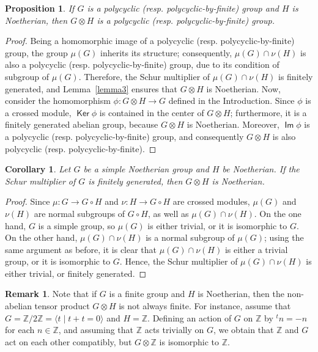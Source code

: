 \documentclass[12pt,reqno]{amsart}
\newtheorem{proposition}[subsection]{Proposition}
\newtheorem{corollary}[subsection]{Corollary}
\theoremstyle{definition}
\newtheorem{remark}[subsection]{Remark}
\numberwithin{equation}{section}
\theoremstyle{definition}
\DeclareMathOperator{\Ker}{\mathsf {Ker}}
\DeclareMathOperator{\Img}{\mathsf {Im}}
\begin{document}
\begin{proposition}  If  $G$ is a polycyclic (resp. polycyclic-by-finite) group and $H$ is Noetherian, then $G\otimes H$ is a
polycyclic (resp. polycyclic-by-finite) group.
\end{proposition}
\begin{proof}  Being a homomorphic image of a polycyclic (resp. polycyclic-by-finite) group, the group $\mu (G)$ inherits its structure; consequently, $\mu (G)\cap \nu (H)$ is also a polycyclic (resp. polycyclic-by-finite) group, due to its condition of subgroup of $\mu (G)$.
Therefore, the Schur multiplier of $\mu (G)\cap \nu (H)$
is finitely generated, and Lemma~\ref{lemma3} ensures that $G\otimes H$ is Noetherian. Now, consider the homomorphism
$\phi \colon G\otimes H \to G$ defined in the Introduction. Since $\phi$ is a crossed module,
$\Ker \phi$ is contained  in the center of $G\otimes H$; furthermore, it is a finitely generated abelian group, because $G\otimes H$ is Noetherian. Moreover, $\Img \phi$ is a polycyclic (resp. polycyclic-by-finite) group, and consequently
$G\otimes H$ is also polycyclic (resp. polycyclic-by-finite).
\end{proof}

\begin{corollary}
Let $G$ be a simple Noetherian group and $H$ be Noetherian. If the Schur multiplier of $G$ is finitely generated,
then $G\otimes H$ is Noetherian.
\end{corollary}
\begin{proof} Since $\mu \colon G \to G\circ H$ and $\nu \colon H \to G\circ H$ are crossed modules, $\mu (G)$ and $\nu (H)$
are normal subgroups of $G\circ H$, as well as $\mu (G)\cap \nu (H)$.
On the one hand, $G$ is a simple group, so $\mu (G)$ is either trivial, or it is isomorphic to $G$. On the other hand, $\mu (G)\cap \nu (H)$ is a normal
subgroup of $\mu (G)$; using the same argument as before, it is clear that $\mu (G)\cap \nu (H)$ is either a trivial group, or it is isomorphic to $G$.
Hence, the Schur multiplier of $\mu (G)\cap \nu (H)$ is either trivial, or finitely generated.
\end{proof}

\begin{remark}
Note that if $G$ is a finite group and $H$ is Noetherian, then the non-abelian tensor product $G\otimes H$ is not
always finite.  For instance, assume that $G=\mathbb{Z}/2\mathbb{Z}=\langle t \mid t+t=0\rangle$ and
$H=\mathbb{Z}$. Defining an action of $G$ on $\mathbb{Z}$ by $^tn=-n$ for each
$n\in \mathbb{Z}$, and assuming that $\mathbb{Z}$ acts trivially on $G$, we obtain that $\mathbb{Z}$ and $G$
act on each other compatibly, but $G\otimes\mathbb{Z}$ is isomorphic to $\mathbb{Z}$.
\end{remark}
\end{document}
